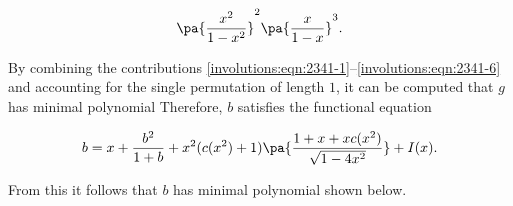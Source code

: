 \documentclass[12pt,twoside]{memoir}
\begin{document}
      \begin{equation}
      \label{involutions:eqn:2341-6}
      \pa{\frac{x^2}{1-x^2}}^2\pa{\frac{x}{1-x}}^3.
      \end{equation}

      By combining the contributions
      \eqref{involutions:eqn:2341-1}--\eqref{involutions:eqn:2341-6} and
      accounting for the single permutation of length $1$, it can be computed
      that $g$ has minimal polynomial Therefore, $b$ satisfies the functional
      equation
        
      $$ b = x + \frac{b^2}{1+b} +  x^2(c(x^2)+1)\pa{\frac{1 + x +
      xc(x^2)}{\sqrt{1-4x^2}}} + I(x). $$

      From this it follows that $b$ has minimal polynomial shown below. 

\end{document}
